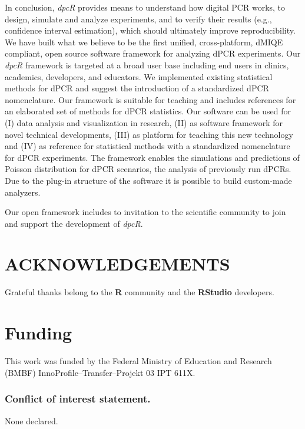 \documentclass[a4,center,fleqn]{NAR}
\begin{document}
In conclusion, \textit{dpcR} provides means to understand how digital PCR works, 
to design, simulate and analyze experiments, and to verify their results (e.g., 
confidence interval estimation), which should ultimately improve 
reproducibility. We have built what we believe to be the first unified, 
cross-platform, dMIQE compliant, open source software framework for 
analyzing dPCR experiments. Our \textit{dpcR} framework is 
targeted at a broad user base including end users in clinics, academics, 
developers, and educators. We implemented existing statistical methods for dPCR 
and suggest the introduction of a standardized dPCR nomenclature. Our 
framework is suitable for teaching and includes references for an elaborated 
set of methods for dPCR statistics. Our software can be used for (I) data 
analysis and visualization in research, (II) as software framework for novel 
technical developments, (III) as platform for teaching this new technology and 
(IV) as reference for statistical methods with a standardized nomenclature for 
dPCR experiments. The framework enables the simulations and predictions of Poisson 
distribution for dPCR scenarios, the analysis of previously run dPCRs. Due to 
the plug-in structure of the software it is possible to build custom-made 
analyzers.

Our open framework includes to invitation to the scientific community to join and 
support the development of \textit{dpcR}.


\section{ACKNOWLEDGEMENTS}

Grateful thanks belong to the \textbf{R} community and the \textbf{RStudio} developers.

\section{Funding}
This work was funded by the Federal Ministry of Education and Research (BMBF) InnoProfile--Transfer--Projekt 03 IPT 611X.
 
\subsubsection{Conflict of interest statement.} None declared.
\newpage




\end{document}
